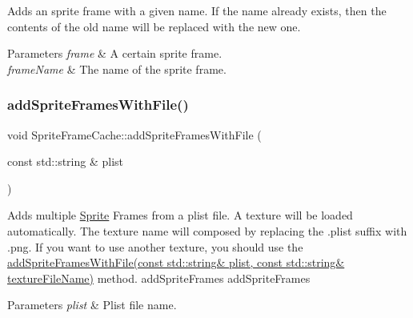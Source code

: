 Adds an sprite frame with a given name. If the name already exists, then the contents of the old name will be replaced with the new one.


\begin{DoxyParams}{Parameters}
{\em frame} & A certain sprite frame. \\
\hline
{\em frame\+Name} & The name of the sprite frame. \\
\hline
\end{DoxyParams}
\mbox{\label{classSpriteFrameCache_ad99267fc3a1f057d2efcbb43f75a9d2e}} 
\subsubsection{\texorpdfstring{add\+Sprite\+Frames\+With\+File()}{addSpriteFramesWithFile()}\hspace{0.1cm}{\footnotesize\ttfamily [1/6]}}
{\footnotesize\ttfamily void Sprite\+Frame\+Cache\+::add\+Sprite\+Frames\+With\+File (\begin{DoxyParamCaption}\item[{const std\+::string \&}]{plist }\end{DoxyParamCaption})}

Adds multiple \hyperlink{classSprite}{Sprite} Frames from a plist file. A texture will be loaded automatically. The texture name will composed by replacing the .plist suffix with .png. If you want to use another texture, you should use the \hyperlink{classSpriteFrameCache_aec8dc209f1f9f297b319af67f0d8aa0c}{add\+Sprite\+Frames\+With\+File(const std\+::string\& plist, const std\+::string\& texture\+File\+Name)} method.  add\+Sprite\+Frames  add\+Sprite\+Frames


\begin{DoxyParams}{Parameters}
{\em plist} & Plist file name. \\
\hline
\end{DoxyParams}
\mbox{\label{classSpriteFrameCache_aec8dc209f1f9f297b319af67f0d8aa0c}} 

